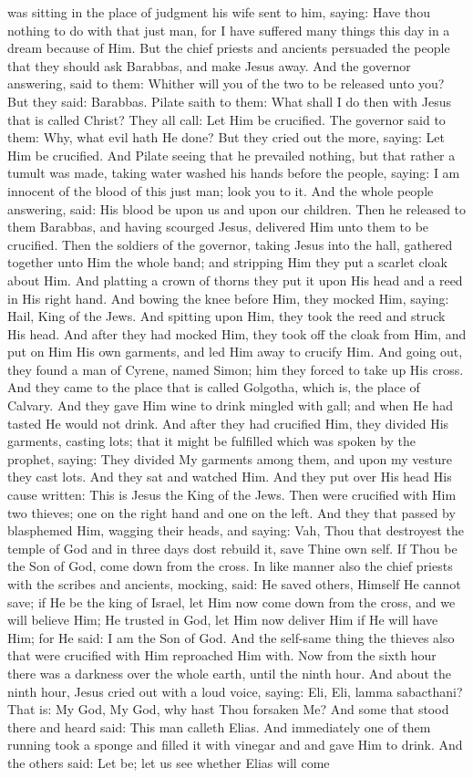 {{was sitting in the place of judgment his wife sent to him, saying: Have thou nothing to do with that just man, for I have suffered many things this day in a dream because of Him. But the chief priests and ancients persuaded the people that they should ask Barabbas, and make Jesus away. And the governor answering, said to them: Whither will you of the two to be released unto you? But they said: Barabbas. Pilate saith to them: What shall I do then with Jesus that is called Christ? They all call: Let Him be crucified. The governor said to them: Why, what evil hath He done? But they cried out the more, saying: Let Him be crucified. And Pilate seeing that he prevailed nothing, but that rather a tumult was made, taking water washed his hands before the people, saying: I am innocent of the blood of this just man; look you to it. And the whole people answering, said: His blood be upon us and upon our children. Then he released to them Barabbas, and having scourged Jesus, delivered Him unto them to be crucified. Then the soldiers of the governor, taking Jesus into the hall, gathered together unto Him the whole band; and stripping Him they put a scarlet cloak about Him. And platting a crown of thorns they put it upon His head and a reed in His right hand. And bowing the knee before Him, they mocked Him, saying: Hail, King of the Jews. And spitting upon Him, they took the reed and struck His head. And after they had mocked Him, they took off the cloak from Him, and put on Him His own garments, and led Him away to crucify Him.  And going out, they found a man of Cyrene, named Simon; him they forced to take up His cross. And they came to the place that is called Golgotha, which is, the place of Calvary. And they gave Him wine to drink mingled with gall; and when He had tasted He would not drink. And after they had crucified Him, they divided His garments, casting lots; that it might be fulfilled which was spoken by the prophet, saying: They divided My garments among them, and upon my vesture they cast lots. And they sat and watched Him. And they put over His head His cause written: This is Jesus the King of the Jews. Then were crucified with Him two thieves; one on the right hand and one on the left. And they that passed by blasphemed Him, wagging their heads, and saying: Vah, Thou that destroyest the temple of God and in three days dost rebuild it, save Thine own self. If Thou be the Son of God, come down from the cross. In like manner also the chief priests with the scribes and ancients, mocking, said: He saved others, Himself He cannot save; if He be the king of Israel, let Him now come down from the cross, and we will believe Him; He trusted in God, let Him now deliver Him if He will have Him; for He said: I am the Son of God. And the self-same thing the thieves also that were crucified with Him reproached Him with. Now from the sixth hour there was a darkness over the whole earth, until the ninth hour.  And about the ninth hour, Jesus cried out with a loud voice, saying: Eli, Eli, lamma sabacthani? That is: My God, My God, why hast Thou forsaken Me? And some that stood there and heard said: This man calleth Elias. And immediately one of them running took a sponge and filled it with vinegar and and gave Him to drink. And the others said: Let be; let us see whether Elias will come }}
